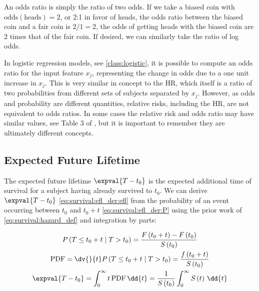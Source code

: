 An odds ratio is simply the ratio of two odds.
If we take a biased coin with $\text{odds}\left(\text{heads}\right) = 2$, or 2:1 in favor of heads,
the odds ratio between the biased coin and a fair coin is $2/1 = 2$,
\ie the odds of getting heads with the biased coin are 2 times that of the fair coin.
If desired, we can similarly take the ratio of log odds.

In logistic regression models, see \cref{class:logistic},
it is possible to compute an odds ratio for the input feature $x_{j}$,
representing the change in odds due to a one unit increase in $x_{j}$.
This is very similar in concept to the HR,
which itself is a ratio of two probabilities from different sets of subjects separated by $x_{j}$.
However, as odds and probability are different quantities,
relative risks, including the HR, are not equivalent to odds ratios.
In some cases the relative risk and odds ratio may have similar values,
see Table 3 of \cite{pmid26623395},
but it is important to remember they are ultimately different concepts.

\subsection{Expected Future Lifetime}
\label{survival::additional:efl}

The expected future lifetime $\expval{T-t_{0}}$ is the
expected additional time of survival for a subject having already survived to $t_{0}$.
We can derive $\expval{T-t_{0}}$ \cref{eq:survival:efl_der:efl}
from the probability of an event occurring between $t_{0}$ and $t_{0} + t$ \cref{eq:survival:efl_der:P}
using the prior work of \cref{eq:survival:hazard_def} and integration by parts:

\begin{subequations}\label{eq:survival:efl_der}
\begin{gather}
P\left(T \leq t_{0} + t \mid T > t_{0}\right)
= \frac{F\left(t_{0} + t\right) - F\left(t_{0}\right)}{S\left(t_{0}\right)} \label{eq:survival:efl_der:P} \\
\text{PDF}
= \dv{}{t} P\left(T \leq t_{0} + t \mid T > t_{0}\right)
= \frac{f\left(t_{0} + t\right)}{S\left(t_{0}\right)} \label{eq:survival:efl_der:pdf} \\
\expval{T-t_{0}}
= \int_{0}^{\infty} t \, \text{PDF} \, \dd{t}
= \frac{1}{S\left(t_{0}\right)} \int_{0}^{\infty} S\left(t\right) \, \dd{t} \label{eq:survival:efl_der:efl}
\end{gather}
\end{subequations}

